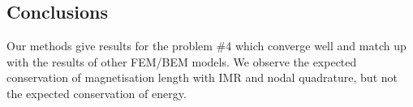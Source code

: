 \subsection{Conclusions}

Our methods give results for the \mumag problem \#4 which converge well and match up with the results of other FEM/BEM models.
We observe the expected conservation of magnetisation length with IMR and nodal quadrature, but not the expected conservation of energy.



